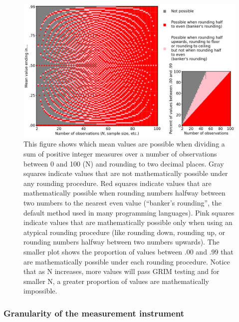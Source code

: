 \documentclass[letterpaper, 12pt]{article}
\begin{document}
\begin{figure}[h!tbp]
    \centering
    \includegraphics[width=\linewidth]{img/grim/250612_grim_possibilites_r2.png}
    \caption*{This figure shows which mean values are possible when dividing a sum of positive integer measures over a number of observations between 0 and 100 (N) and rounding to two decimal places. Gray squares indicate values that are not mathematically possible under any rounding procedure. Red squares indicate values that are mathematically possible when rounding numbers halfway between two numbers to the nearest even value (``banker's rounding'', the default method used in many programming languages). Pink squares indicate values that are mathematically possible only when using an atypical rounding procedure (like rounding down, rounding up, or rounding numbers halfway between two numbers upwards). The smaller plot shows the proportion of values between .00 and .99 that are mathematically possible under each rounding procedure. Notice that as N increases, more values will pass GRIM testing and for smaller N, a greater proportion of values are mathematically impossible.}
\end{figure}

\subsubsection*{Granularity of the measurement instrument}
\end{document}
